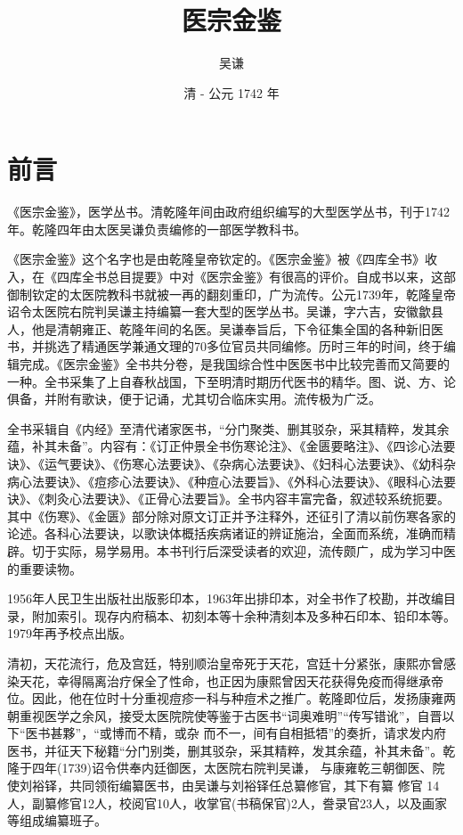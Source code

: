 \documentclass[a4paper,12pt,UTF8,twoside]{ctexbook}
\title{\heiti\zihao{0} 医宗金鉴}
\author{吴谦}
\date{清 - 公元 1742 年}
\begin{document}
	\maketitle
	
	\tableofcontents
	
	\frontmatter
	
	\chapter{前言}
	
	《医宗金鉴》，医学丛书。清乾隆年间由政府组织编写的大型医学丛书，刊于1742年。乾隆四年由太医吴谦负责编修的一部医学教科书。
	
	《医宗金鉴》这个名字也是由乾隆皇帝钦定的。《医宗金鉴》被《四库全书》收入，在《四库全书总目提要》中对《医宗金鉴》有很高的评价。自成书以来，这部御制钦定的太医院教科书就被一再的翻刻重印，广为流传。公元1739年，乾隆皇帝诏令太医院右院判吴谦主持编纂一套大型的医学丛书。吴谦，字六吉，安徽歙县人，他是清朝雍正、乾隆年间的名医。吴谦奉旨后，下令征集全国的各种新旧医书，并挑选了精通医学兼通文理的70多位官员共同编修。历时三年的时间，终于编辑完成。《医宗金鉴》全书共分卷，是我国综合性中医医书中比较完善而又简要的一种。全书采集了上自春秋战国，下至明清时期历代医书的精华。图、说、方、论俱备，并附有歌诀，便于记诵，尤其切合临床实用。流传极为广泛。
	
	全书采辑自《内经》至清代诸家医书，“分门聚类、删其驳杂，采其精粹，发其余蕴，补其未备”。内容有：《订正仲景全书伤寒论注》、《金匮要略注》、《四诊心法要诀》、《运气要诀》、《伤寒心法要诀》、《杂病心法要诀》、《妇科心法要诀》、《幼科杂病心法要诀》、《痘疹心法要诀》、《种痘心法要旨》、《外科心法要诀》、《眼科心法要诀》、《刺灸心法要诀》、《正骨心法要旨》。全书内容丰富完备，叙述较系统扼要。其中《伤寒》、《金匮》部分除对原文订正并予注释外，还征引了清以前伤寒各家的论述。各科心法要诀，以歌诀体概括疾病诸证的辨证施治，全面而系统，准确而精辟。切于实际，易学易用。本书刊行后深受读者的欢迎，流传颇广，成为学习中医的重要读物。
	
	1956年人民卫生出版社出版影印本，1963年出排印本，对全书作了校勘，并改编目录，附加索引。现存内府稿本、初刻本等十余种清刻本及多种石印本、铅印本等。1979年再予校点出版。
			
	清初，天花流行，危及宫廷，特别顺治皇帝死于天花，宫廷十分紧张，康熙亦曾感染天花，幸得隔离治疗保全了性命，也正因为康熙曾因天花获得免疫而得继承帝位。因此，他在位时十分重视痘疹一科与种痘术之推广。乾隆即位后，发扬康雍两朝重视医学之余风，接受太医院院使等鉴于古医书“词奥难明”“传写错讹”，自晋以下“医书甚夥”，“或博而不精，或杂 而不一，间有自相抵牾”的奏折，请求发内府医书，并征天下秘籍“分门别类，删其驳杂，采其精粹，发其余蕴，补其未备”。乾隆于四年(1739)诏令供奉内廷御医，太医院右院判吴谦， 与康雍乾三朝御医、院使刘裕铎，共同领衔编纂医书，由吴谦与刘裕铎任总纂修官，其下有纂 修官  14人，副纂修官12人，校阅官10人，收掌官(书稿保官)2人，誊录官23人，以及画家等组成编纂班子。
	
\end{document}
